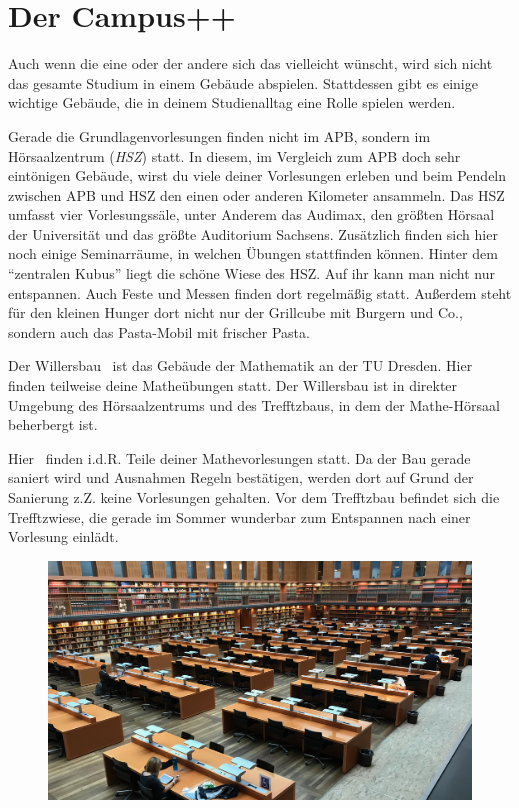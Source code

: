 \chapter*{Der Campus++}

Auch wenn die eine oder der andere sich das vielleicht wünscht, wird sich nicht das gesamte Studium in einem Gebäude abspielen.
Stattdessen gibt es einige wichtige Gebäude, die in deinem Studienalltag eine Rolle spielen werden.

Gerade die Grundlagenvorlesungen finden nicht im APB, sondern im Hörsaalzentrum (\emph{HSZ}) statt.
In diesem, im Vergleich zum APB doch sehr eintönigen Gebäude, wirst du viele deiner Vorlesungen erleben und beim Pendeln zwischen APB und HSZ den einen oder anderen Kilometer ansammeln.
Das HSZ umfasst vier Vorlesungssäle, unter Anderem das Audimax, den größten Hörsaal der Universität und das größte Auditorium Sachsens.
Zusätzlich finden sich hier noch einige Seminarräume, in welchen Übungen stattfinden können. Hinter dem \enquote{zentralen Kubus} liegt die schöne Wiese des HSZ\@. Auf ihr kann man nicht nur entspannen. Auch Feste und Messen finden dort regelmäßig statt.
Außerdem steht für den kleinen Hunger dort nicht nur
der Grillcube mit Burgern und Co., sondern auch das Pasta-Mobil mit frischer Pasta.

Der Willersbau~ ist das Gebäude der Mathematik an der TU Dresden. Hier finden teilweise deine Matheübungen statt. Der Willersbau ist in direkter Umgebung
des Hörsaalzentrums und des Trefftzbaus, in dem der Mathe-Hörsaal beherbergt ist.

Hier~ finden i.d.R. Teile deiner Mathevorlesungen statt. Da der Bau gerade saniert wird und Ausnahmen Regeln bestätigen, werden dort auf Grund der Sanierung z.Z. keine Vorlesungen gehalten. Vor dem Trefftzbau befindet sich die Trefftzwiese, die gerade im Sommer wunderbar zum Entspannen nach
einer Vorlesung einlädt.

\begin{figure}[b!]
    \centering
    \includegraphics[width=\linewidth]{img/slub-lesesaal}
\end{figure}

